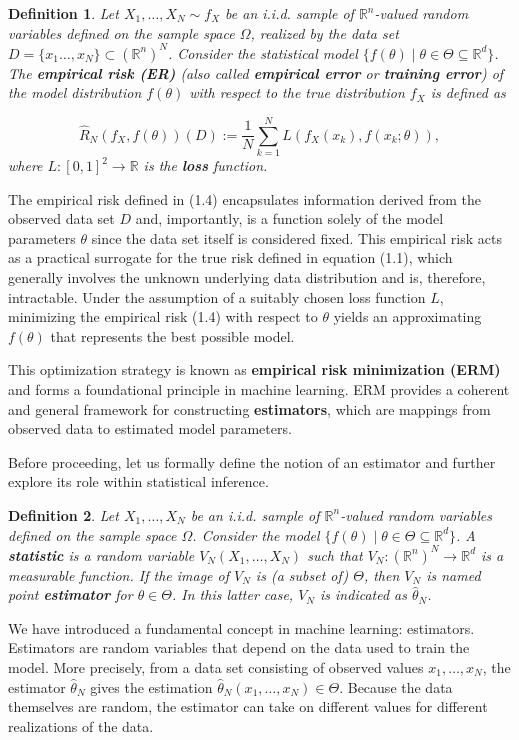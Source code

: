 \documentclass{report}
\newtheorem{definition}{Definition}[chapter]
\begin{document}
\begin{definition}
Let $X_1,\dots,X_N \sim f_X$ be an i.i.d. sample of $\mathbb{R}^n$-valued random variables defined on the sample space $\Omega$, realized by the data set $D = \{x_1\dots,x_N\} \subset (\mathbb{R}^n)^N$. Consider the statistical model $\{f(\theta) \mid \theta \in \Theta \subseteq \mathbb{R}^d\}$. The \textbf{empirical risk (ER)} (also called \textbf{empirical error} or \textbf{training error}) of the model distribution $f(\theta)$ with respect to the true distribution $f_X$ is defined as

\begin{equation}
\hat{R}_N(f_X,f(\theta))(D) := \frac{1}{N}\sum_{k=1}^{N}L(f_X(x_k),f(x_k;\theta)),
\end{equation}
where $L : [0,1]^2 \to \mathbb{R}$ is the \textbf{loss} function.
\end{definition}
The empirical risk defined in (1.4) encapsulates information derived from the observed data set $D$ and, importantly, is a function solely of the model parameters $\theta$ since the data set itself is considered fixed. This empirical risk acts as a practical surrogate for the true risk defined in equation (1.1), which generally involves the unknown underlying data distribution and is, therefore, intractable. Under the assumption of a suitably chosen loss function $L$, minimizing the empirical risk (1.4) with respect to $\theta$ yields an approximating $f(\theta)$ that represents the best possible model.

This optimization strategy is known as \textbf{empirical risk minimization (ERM)} and forms a foundational principle in machine learning. ERM provides a coherent and general framework for constructing \textbf{estimators}, which are mappings from observed data to estimated model parameters.

Before proceeding, let us formally define the notion of an estimator and further explore its role within statistical inference.

\begin{definition}
Let $X_1,\dots,X_N$ be an i.i.d. sample of $\mathbb{R}^n$-valued random variables defined on the sample space $\Omega$. Consider the model $\{f(\theta) \mid \theta \in \Theta \subseteq \mathbb{R}^d \}$. A \textbf{statistic} is a random variable $V_N(X_1,\dots,X_N)$ such that $V_N : (\mathbb{R}^n)^N \to \mathbb{R}^d$ is a measurable function. If the image of $V_N$ is (a subset of) $\Theta$, then $V_N$ is named point \textbf{estimator} for $\theta \in \Theta$. In this latter case, $V_N$ is indicated as $\hat{\theta}_N$.
\end{definition}
We have introduced a fundamental concept in machine learning: estimators. Estimators are random variables that depend on the data used to train the model. More precisely, from a data set consisting of observed values $x_1,\dots,x_N$, the estimator $\hat{\theta}_N$ gives the estimation $\hat{\theta}_N(x_1,\dots,x_N) \in \Theta$. Because the data themselves are random, the estimator can take on different values for different realizations of the data.
\end{document}
